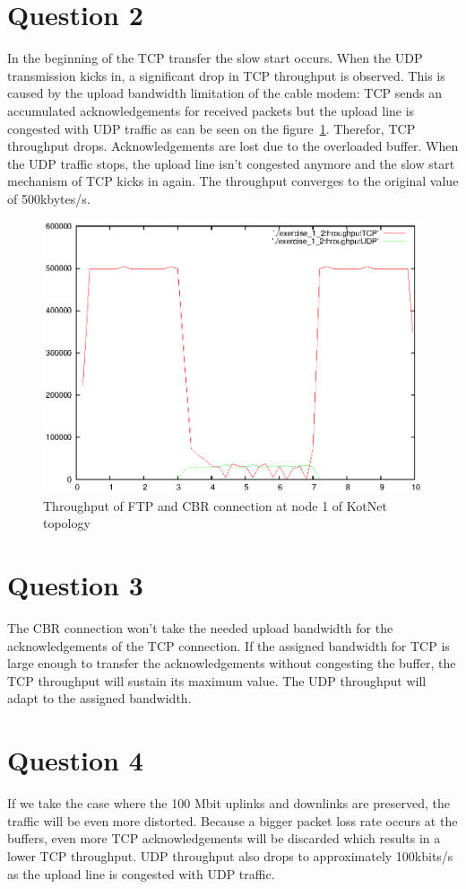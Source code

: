 \documentclass[a4paper]{report}
\begin{document}
\section*{Question 2}
In the beginning of the TCP transfer the slow start occurs. When the UDP transmission kicks in, a significant drop in TCP throughput is observed. This is caused by the upload bandwidth limitation of the cable modem: TCP sends an accumulated acknowledgements for received packets but the upload line is congested with UDP traffic as can be seen on the figure~\ref{ex1:question2}. Therefor, TCP throughput drops. Acknowledgements are lost due to the overloaded buffer. When the UDP traffic stops, the upload line isn't congested anymore and the slow start mechanism of TCP kicks in again. The throughput converges to the original value of 500kbytes/s.
\begin{figure}[h]
\centerline{\includegraphics{pictures/E1Q2.eps}}
\caption{Throughput of FTP and CBR connection at node 1 of KotNet topology}
\label{ex1:question2}
\end{figure}

\section*{Question 3}
The CBR connection won't take the needed upload bandwidth for the acknowledgements of the TCP connection. 
If the assigned bandwidth for TCP is large enough to transfer the acknowledgements without congesting the buffer, the TCP throughput will sustain its maximum value. The UDP throughput will adapt to the assigned bandwidth.  

\section*{Question 4}
If we take the case where the 100 Mbit uplinks and downlinks are preserved, the traffic will be even more distorted. Because a bigger packet loss rate occurs at the buffers, even more TCP acknowledgements will be discarded which results in a lower TCP throughput. UDP throughput also drops to approximately 100kbits/s as the upload line is congested with UDP traffic.
\end{document}
